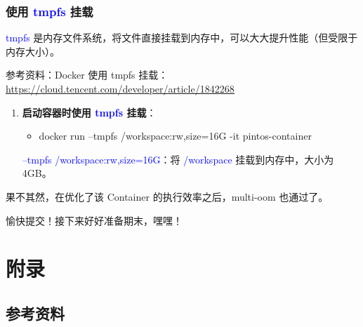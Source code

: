 \documentclass[14pt,a4paper,UTF8,twoside]{article}
\renewcommand{\texttt}[1]{\textcolor{blue}{\ttfamily #1}}
\begin{document}
\begin{ans}{}{}

\subsubsection*{使用 \texttt{tmpfs} 挂载}

\texttt{tmpfs} 是内存文件系统，将文件直接挂载到内存中，可以大大提升性能（但受限于内存大小）。

参考资料：Docker 使用 tmpfs 挂载：\href{https://cloud.tencent.com/developer/article/1842268}{\underline{https://cloud.tencent.com/developer/article/1842268}}
\begin{enumerate}
    \item \textbf{启动容器时使用 \texttt{tmpfs} 挂载}：
    \begin{itemize}
        \item docker run --tmpfs /workspace:rw,size=16G -it pintos-container
    \end{itemize}
    \texttt{--tmpfs /workspace:rw,size=16G}：将 \texttt{/workspace} 挂载到内存中，大小为 4GB。
\end{enumerate}

果不其然，在优化了该 Container 的执行效率之后，multi-oom 也通过了。

\end{ans}

愉快提交！接下来好好准备期末，嘿嘿！

\section{附录}

\subsection*{参考资料}
\end{document}
